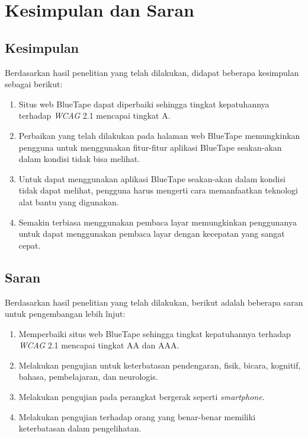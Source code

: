 \chapter{Kesimpulan dan Saran}
\label{chap:kesimpulan_dan_saran}

\section{Kesimpulan}
\label{sec:kesimpulan}
Berdasarkan hasil penelitian yang telah dilakukan, didapat beberapa kesimpulan sebagai berikut:

\begin{enumerate}
    \item Situs web BlueTape dapat diperbaiki sehingga tingkat kepatuhannya terhadap \textit{WCAG} 2.1 mencapai tingkat A.
    \item Perbaikan yang telah dilakukan pada halaman web BlueTape memungkinkan pengguna untuk menggunakan fitur-fitur aplikasi BlueTape seakan-akan dalam kondisi tidak bisa melihat.
    \item Untuk dapat menggunakan aplikasi BlueTape seakan-akan dalam kondisi tidak dapat melihat, pengguna harus mengerti cara memanfaatkan teknologi alat bantu yang digunakan.
    \item Semakin terbiasa menggunakan pembaca layar memungkinkan penggunanya untuk dapat menggunakan pembaca layar dengan kecepatan yang sangat cepat.
\end{enumerate}

\section{Saran}
\label{sec:saran}
Berdasarkan hasil penelitian yang telah dilakukan, berikut adalah beberapa saran untuk pengembangan lebih lnjut:
\begin{enumerate}
    \item Memperbaiki situs web BlueTape sehingga tingkat kepatuhannya terhadap \textit{WCAG} 2.1 mencapai tingkat AA dan AAA.
    \item Melakukan pengujian untuk keterbatasan pendengaran, fisik, bicara, kognitif, bahasa, pembelajaran, dan neurologis.
    \item Melakukan pengujian pada perangkat bergerak seperti \textit{smartphone}.
    \item Melakukan pengujian terhadap orang yang benar-benar memiliki keterbatasan dalam pengelihatan.
\end{enumerate}